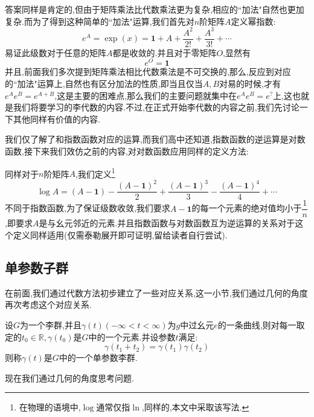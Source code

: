 答案同样是肯定的,但由于矩阵乘法比代数乘法更为复杂,相应的``加法"自然也更加复杂.而为了得到这种简单的``加法"运算,我们首先对$n$阶矩阵$A$定义幂指数:
\begin{equation}
	e^A=\exp(x)=\textbf{1}+A+\frac{A^2}{2!}+\frac{A^3}{3!}+\cdots 
\end{equation}
易证此级数对于任意的矩阵$A$都是收敛的.并且对于零矩阵$O$,显然有
\begin{equation}
	e^O=\textbf{1}
\end{equation}
并且,前面我们多次提到矩阵乘法相比代数乘法是不可交换的,那么,反应到对应的``加法"运算上,自然也有区分加法的性质,即当且仅当$A,B$对易的时候,才有$e^Ae^B=e^{A+B}$,这是主要的困难点,那么我们的主要问题就集中在$e^Ae^B=e^{?}$上,这也就是我们将要学习的李代数的内容.不过,在正式开始李代数的内容之前,我们先讨论一下其他同样有价值的内容.

我们仅了解了和指数函数对应的运算,而我们高中还知道,指数函数的逆运算是对数函数,接下来我们效仿之前的内容,对对数函数应用同样的定义方法:

同样对于$n$阶矩阵$A$,我们定义\footnote{在物理的语境中,$\log$通常仅指$\ln$,同样的,本文中采取该写法.}
\begin{equation}
	\log A=(A-\textbf{1})-\frac{(A-\textbf{1})^2}2+\frac{(A-\textbf{1})^3}3-\frac{(A-\textbf{1})^4}4+\cdots 
\end{equation}
不同于指数函数,为了保证级数收敛,我们要求$A-\textbf{1}$的每一个元素的绝对值均小于$\dfrac{1}{n}$,即要求$A$是与幺元邻近的元素.并且指数函数与对数函数互为逆运算的关系对于这个定义同样适用(仅需泰勒展开即可证明,留给读者自行尝试).
\subsection{单参数子群}
在前面,我们通过代数方法初步建立了一些对应关系,这一小节,我们通过几何的角度再次考虑这个对应关系.

\begin{definition}[单参数子群]
	设$G$为一个李群,并且$\gamma(t)(-\infty<t<\infty)$为$g$中过幺元$e$的一条曲线,则对每一取定的$t_0\in \mathbb{R},\gamma(t_0)$是$G$中的一个元素.并设参数$t$满足:
	\begin{equation}
		\gamma(t_1+t_2)=\gamma(t_1)\gamma(t_2)
	\end{equation}
	则称$\gamma(t)$是$G$中的一个单参数李群.
\end{definition}

现在我们通过几何的角度思考问题.

